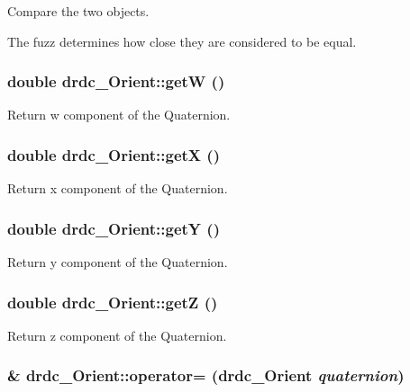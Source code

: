 Compare the two objects. 

The fuzz determines how close they are considered to be equal. \hypertarget{classdrdc__Orient_008ad19db03958744df1fa439bdfe48d}{
\subsubsection[getW]{\setlength{\rightskip}{0pt plus 5cm}double drdc\_\-Orient::getW ()}}
\label{classdrdc__Orient_008ad19db03958744df1fa439bdfe48d}


Return w component of the Quaternion. 

\hypertarget{classdrdc__Orient_5b811f266b864851414d64c14fe85b56}{
\subsubsection[getX]{\setlength{\rightskip}{0pt plus 5cm}double drdc\_\-Orient::getX ()}}
\label{classdrdc__Orient_5b811f266b864851414d64c14fe85b56}


Return x component of the Quaternion. 

\hypertarget{classdrdc__Orient_13857b4e5319328a2659463b9e526781}{
\subsubsection[getY]{\setlength{\rightskip}{0pt plus 5cm}double drdc\_\-Orient::getY ()}}
\label{classdrdc__Orient_13857b4e5319328a2659463b9e526781}


Return y component of the Quaternion. 

\hypertarget{classdrdc__Orient_fbb0ef7390f7332228d43c71e610f546}{
\subsubsection[getZ]{\setlength{\rightskip}{0pt plus 5cm}double drdc\_\-Orient::getZ ()}}
\label{classdrdc__Orient_fbb0ef7390f7332228d43c71e610f546}


Return z component of the Quaternion. 

\hypertarget{classdrdc__Orient_4e0336356d63d3c9011cd4f3c9894977}{
\subsubsection[operator=]{\& drdc\_\-Orient::operator= ({\bf drdc\_\-Orient} {\em quaternion})}}
\label{classdrdc__Orient_4e0336356d63d3c9011cd4f3c9894977}


